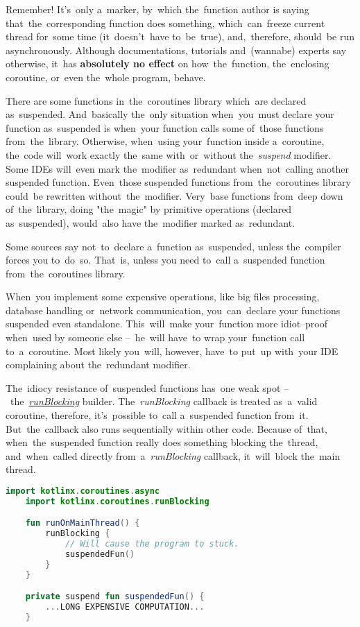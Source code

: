 \noindent Remember!
It's~only a~marker, by~which the~function author is saying that~the~corresponding function does something, which~can~freeze current thread for~some time (it~doesn't~have to~be~true), and,~therefore, should~be run asynchronously.
Although documentations, tutorials and~(wannabe) experts say otherwise, it~has \textbf{absolutely no effect} on how~the~function, the~enclosing coroutine, or~even the~whole program, \mbox{behave.}

There are some functions in~the~coroutines library which~are declared as~suspended.
And~basically the~only situation when~you~must declare your function as~suspended is when~your function calls some of~those functions from~the~library.
Otherwise, when~using your~function inside a~coroutine, the~code will~work exactly the~same with~or~without \mbox{the \textit{suspend}} modifier.
Some \mbox{IDEs} will~even mark the~modifier as~redundant when~not~calling another suspended function.
Even~those suspended functions from~the~coroutines library could~be rewritten without~the~modifier.
Very~base functions from~deep down of~the~library, doing \mbox{"the magic"} by primitive operations (declared as~suspended), would~also have the~modifier marked \mbox{as redundant}.

Some sources say not~to~declare a~function as~suspended, unless the~compiler forces you to~do~so.
That~is, unless you need to~call a~suspended function from~the~coroutines \mbox{library.}

When~you implement some expensive operations, like big files processing, database handling or~network communication, you~can~declare your functions suspended even standalone.
This~will~make your~function more idiot--proof when~used by someone else --~he~will have~to wrap your~function call to~a~coroutine.
Most likely you~will, however, have~to put~up with~your IDE complaining about the~redundant \mbox{modifier.}

\warning The~idiocy resistance of~suspended functions has~one weak spot \mbox{-- the \textit{\hyperref[kotlincoroutinerunblocking]{runBlocking}}} builder.
\mbox{The \textit{runBlocking}} callback is treated as~a~valid coroutine, therefore, it's~possible to~call a~suspended function from~it.
But~the~callback also runs sequentially within other code.
Because of~that, when~the~suspended function really does something blocking the~thread, and~when~called directly \mbox{from a \textit{runBlocking}} callback, it~will~block the~main \mbox{thread.}

\begin{lstlisting}[language=Kotlin]
    import kotlinx.coroutines.async
    import kotlinx.coroutines.runBlocking

    fun runOnMainThread() {
        runBlocking {
            // Will cause the program to stuck.
            suspendedFun()
        }
    }

    private suspend fun suspendedFun() {
        ...LONG EXPENSIVE COMPUTATION...
    }
\end{lstlisting}

